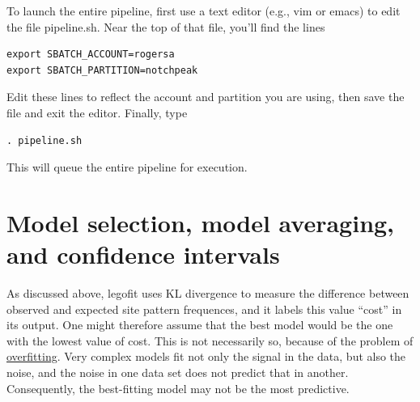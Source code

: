 \documentclass[11pt]{article}
\begin{document}
To launch the entire pipeline, first use a text editor (e.g., vim or
emacs) to edit the file pipeline.sh. Near the top of that file, you'll
find the lines
\begin{verbatim}
export SBATCH_ACCOUNT=rogersa
export SBATCH_PARTITION=notchpeak
\end{verbatim}
Edit these lines to reflect the account and partition you are using,
then save the file and exit the editor. Finally, type
\begin{verbatim}
. pipeline.sh
\end{verbatim}
This will queue the entire pipeline for execution.

\section{Model selection, model averaging, and confidence intervals}
\label{sec.msma}
As discussed above, legofit uses KL divergence to measure the
difference between observed and expected site pattern frequences, and
it labels this value ``cost'' in its output. One might therefore
assume that the best model would be the one with the lowest value of
cost. This is not necessarily so, because of the problem of
\href{https://en.wikipedia.org/wiki/Overfitting}{overfitting}. Very
complex models fit not only the signal in the data, but also the
noise, and the noise in one data set does not predict that in
another. Consequently, the best-fitting model may not be the most
predictive.
\end{document}
